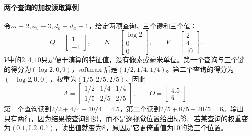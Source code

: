 \paragraph{两个查询的加权读取算例}
令$m=2,n_v=3,d_k=d_a=1$，给定两项查询、三个键和三个值：
\begin{equation}
 Q=\begin{bmatrix}1\\-1\end{bmatrix},\qquad
 K=\begin{bmatrix}\log2\\0\\0\end{bmatrix},\qquad
 V=\begin{bmatrix}2\\4\\10\end{bmatrix}.
\end{equation}
$V$中的$2,4,10$只是便于演算的特征值，没有像素或毫米单位。第一个查询与三个键的得分为$(\log2,0,0)$，softmax 后是$(1/2,1/4,1/4)$。第二个查询的得分为$(-\log2,0,0)$，权重为$(1/5,2/5,2/5)$。因此
\begin{equation}
 A=\begin{bmatrix}1/2&1/4&1/4\\1/5&2/5&2/5\end{bmatrix},
 \qquad O=\begin{bmatrix}4.5\\6\end{bmatrix}.
\end{equation}
第一个查询读到$2/2+4/4+10/4=4.5$，第二个读到$2/5+8/5+20/5=6$。输出只有两行，因为结果按查询组织，而不是逐视觉位置给出标签。若某查询的权重变为$(0.1,0.2,0.7)$，读出值就变为$8$，原因是它更倚重值为$10$的第三个位置。


